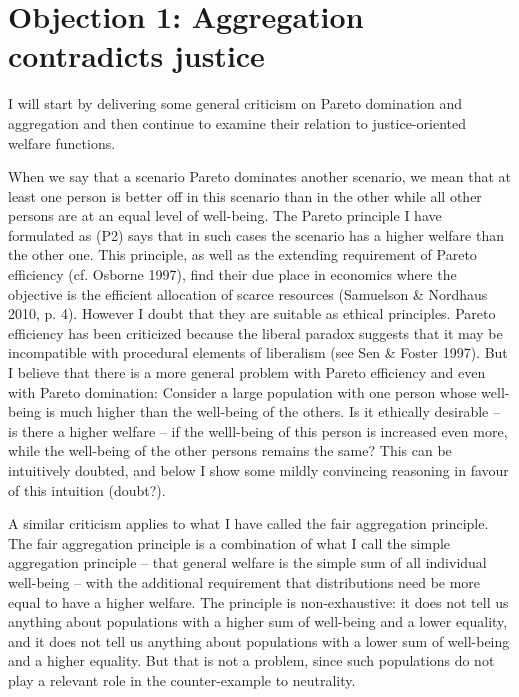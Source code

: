\chapter{Objection 1: Aggregation contradicts justice}

 I will start by delivering some general criticism on Pareto domination and aggregation and then continue to examine their relation to justice-oriented welfare functions.  

 When we say that a scenario Pareto dominates another scenario, we mean that at least one person is better off in this scenario than in the other while all other persons are at an equal level of well-being. The Pareto principle I have formulated as (P2) says that in such cases the scenario has a higher welfare than the other one. This principle, as well as the extending requirement of Pareto efficiency (cf. \label{ref:RND8Hv7yXwRou}Osborne 1997), find their due place in economics where the objective is the efficient allocation of scarce resources (\label{ref:RNDutDkBfheMg}Samuelson \& Nordhaus 2010, p. 4). However I doubt that they are suitable as ethical principles. Pareto efficiency has been criticized because the liberal paradox suggests that it may be incompatible with procedural elements of liberalism (see \label{ref:RNDiYsz4NL9rY}Sen \& Foster 1997). But I believe that there is a more general problem with Pareto efficiency and even with Pareto domination: Consider a large population with one person whose well-being is much higher than the well-being of the others. Is it ethically desirable – is there a higher welfare – if the welll-being of this person is increased even more, while the well-being of the other persons remains the same? This can be intuitively doubted, and below I show some mildly convincing reasoning in favour of this intuition (doubt?).  

 A similar criticism applies to what I have called the fair aggregation principle. The fair aggregation principle is a combination of what I call the simple aggregation principle – that general welfare is the simple sum of all individual well-being – with the additional requirement that distributions need be more equal to have a higher welfare. The principle is non-exhaustive: it does not tell us anything about populations with a higher sum of well-being and a lower equality, and it does not tell us anything about populations with a lower sum of well-being and a higher equality. But that is not a problem, since such populations do not play a relevant role in the counter-example to neutrality.  

